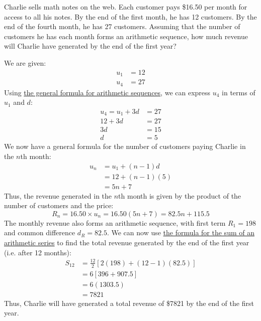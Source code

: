 \begin{exercise}[Hard]
	Charlie sells math notes on the web. Each customer pays \$16.50 per month for access to all his notes. 
	By the end of the first month, he has 12 customers. By the end of the fourth month, he has 27 customers.
	Assuming that the number of customers he has each month forms an arithmetic sequence, how much revenue
	will Charlie have generated by the end of the first year?
\end{exercise}
\begin{answer}
	We are given:
	\begin{align*}
		u_1 &= 12 \\
		u_4 &= 27
	\end{align*}
	Using \hyperref[prop:arithmetic-general-formula]{the general formula for arithmetic sequences}, we can express $u_4$ in terms of $u_1$ and $d$:
	\begin{align*}
		u_4 = u_1 + 3d &= 27 \\
		12 + 3d &= 27 \\
		3d &= 15 \\
		d &= 5
	\end{align*}
	We now have a general formula for the number of customers paying Charlie in the $n$th month:
	\begin{align*}
		u_n &= u_1 + (n-1)d \\
		&= 12 + (n-1)(5) \\
		&= 5n + 7
	\end{align*}
	Thus, the revenue generated in the $n$th month is given by the product of the number of customers and the price:
	\begin{equation*}
		R_n = 16.50 \times u_n = 16.50(5n + 7) = 82.5n + 115.5
	\end{equation*}
	The monthly revenue also forms an arithmetic sequence, with first term $R_1 = 198$ and common difference $d_R = 82.5$.
	We can now use \hyperref[prop:arithmetic-series-sum]{the formula for the sum of an arithmetic series} to find the total revenue
	generated by the end of the first year (i.e. after 12 months):
	\begin{align*}
		S_{12} &= \frac{12}{2}[2(198) + (12-1)(82.5)] \\
		&= 6[396 + 907.5] \\
		&= 6(1303.5) \\
		&= 7821
	\end{align*}
	Thus, Charlie will have generated a total revenue of \$7821 by the end of the first year.
\end{answer}

